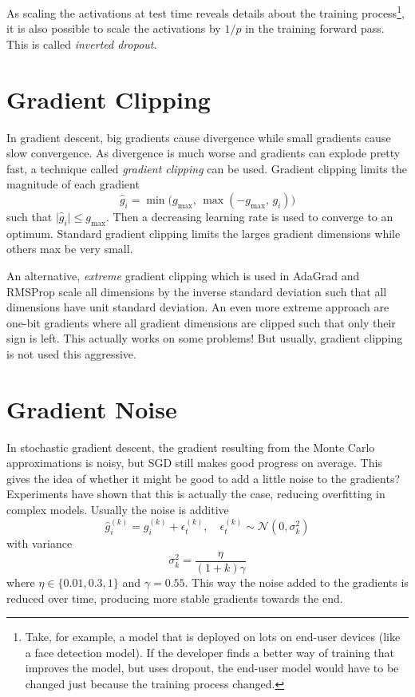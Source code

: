 		As scaling the activations at test time reveals details about the training process\footnote{Take, for example, a model that is deployed on lots on end-user devices (like a face detection model). If the developer finds a better way of training that improves the model, but uses dropout, the end-user model would have to be changed just because the training process changed.}, it is also possible to scale the activations by \(1/p\) in the training forward pass. This is called \emph{inverted dropout}.

	\section{Gradient Clipping}
		In gradient descent, big gradients cause divergence while small gradients cause slow convergence. As divergence is much worse and gradients can explode pretty fast, a technique called \emph{gradient clipping} can be used. Gradient clipping limits the magnitude of each gradient
		\begin{equation}
			\hat{g}_i = \min\big( g_\mathrm{max},\, \max(-g_\mathrm{max},\, g_i) \big)
		\end{equation}
		such that \( \lvert \hat{g}_i \rvert \leq g_\mathrm{max} \). Then a decreasing learning rate is used to converge to an optimum. Standard gradient clipping limits the larges gradient dimensions while others max be very small.

		An alternative, \emph{extreme} gradient clipping which is used in AdaGrad and RMSProp scale all dimensions by the inverse standard deviation such that all dimensions have unit standard deviation. An even more extreme approach are one-bit gradients where all gradient dimensions are clipped such that only their sign is left. This actually works on some problems! But usually, gradient clipping is not used this aggressive.

	\section{Gradient Noise}
		In stochastic gradient descent, the gradient resulting from the Monte Carlo approximations is noisy, but SGD still makes good progress on average. This gives the idea of whether it might be good to add a little noise to the gradients? Experiments have shown that this is actually the case, reducing overfitting in complex models. Usually the noise is additive
		\begin{equation}
			\hat{g}_i^{(k)} = g_i^{(k)} + \epsilon_t^{(k)},\quad \epsilon_t^{(k)} \sim \mathcal{N}(0, \sigma_k^2)
		\end{equation}
		with variance
		\begin{equation}
			\sigma_k^2 = \frac{\eta}{(1 + k) \gamma}
		\end{equation}
		where \( \eta \in \{ 0.01, 0.3, 1 \} \) and \( \gamma = 0.55 \). This way the noise added to the gradients is reduced over time, producing more stable gradients towards the end.

